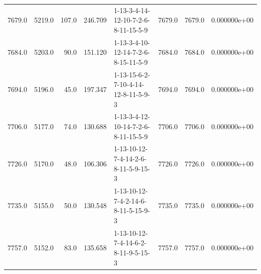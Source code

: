 \begin{tabular}{rrrrlrrr}
 7679.0 &  5219.0 &          107.0 &            246.709 &  1-13-3-4-14-12-10-7-2-6-8-11-15-5-9 &        7679.0 &          7679.0 &  0.000000e+00 \\
 7684.0 &  5203.0 &           90.0 &            151.120 &  1-13-3-4-10-12-14-7-2-6-8-15-11-5-9 &        7684.0 &          7684.0 &  0.000000e+00 \\
 7694.0 &  5196.0 &           45.0 &            197.347 &  1-13-15-6-2-7-10-4-14-12-8-11-5-9-3 &        7694.0 &          7694.0 &  0.000000e+00 \\
 7706.0 &  5177.0 &           74.0 &            130.688 &  1-13-3-4-12-10-14-7-2-6-8-11-15-5-9 &        7706.0 &          7706.0 &  0.000000e+00 \\
 7726.0 &  5170.0 &           48.0 &            106.306 &  1-13-10-12-7-4-14-2-6-8-11-5-9-15-3 &        7726.0 &          7726.0 &  0.000000e+00 \\
 7735.0 &  5155.0 &           50.0 &            130.548 &  1-13-10-12-7-4-2-14-6-8-11-5-15-9-3 &        7735.0 &          7735.0 &  0.000000e+00 \\
 7757.0 &  5152.0 &           83.0 &            135.658 &  1-13-10-12-7-4-14-6-2-8-11-9-5-15-3 &        7757.0 &          7757.0 &  0.000000e+00 \\
\bottomrule
\end{tabular}
